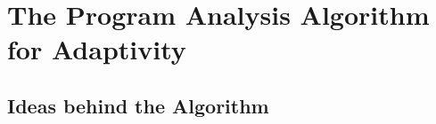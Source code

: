 \chapter{The Program Analysis Algorithm for Adaptivity}
\label{ch:adapt-algo}


\section{Ideas behind the Algorithm}
\label{sec:adapt-algo-ideas}
